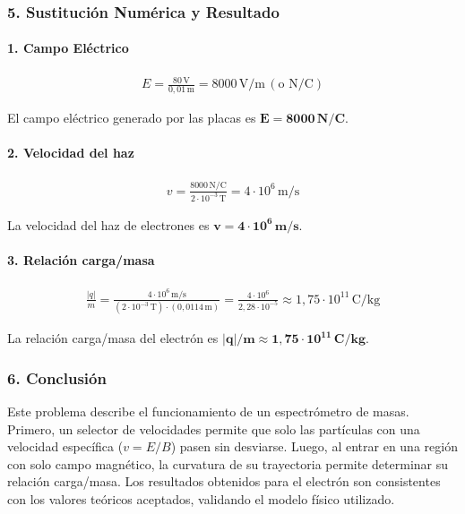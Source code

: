 \subsubsection*{5. Sustitución Numérica y Resultado}
\paragraph{1. Campo Eléctrico}
\begin{gather}
    E = \frac{80 \, \text{V}}{0,01 \, \text{m}} = 8000 \, \text{V/m} \, (\text{o N/C})
\end{gather}
\begin{cajaresultado}
El campo eléctrico generado por las placas es $\boldsymbol{E = 8000 \, N/C}$.
\end{cajaresultado}

\paragraph{2. Velocidad del haz}
\begin{gather}
    v = \frac{8000 \, \text{N/C}}{2 \cdot 10^{-3} \, \text{T}} = 4 \cdot 10^6 \, \text{m/s}
\end{gather}
\begin{cajaresultado}
La velocidad del haz de electrones es $\boldsymbol{v = 4 \cdot 10^6 \, m/s}$.
\end{cajaresultado}

\paragraph{3. Relación carga/masa}
\begin{gather}
    \frac{|q|}{m} = \frac{4 \cdot 10^6 \, \text{m/s}}{(2 \cdot 10^{-3} \, \text{T}) \cdot (0,0114 \, \text{m})} = \frac{4 \cdot 10^6}{2,28 \cdot 10^{-5}} \approx 1,75 \cdot 10^{11} \, \text{C/kg}
\end{gather}
\begin{cajaresultado}
La relación carga/masa del electrón es $\boldsymbol{|q|/m \approx 1,75 \cdot 10^{11} \, C/kg}$.
\end{cajaresultado}

\subsubsection*{6. Conclusión}
\begin{cajaconclusion}
Este problema describe el funcionamiento de un espectrómetro de masas. Primero, un selector de velocidades permite que solo las partículas con una velocidad específica ($v=E/B$) pasen sin desviarse. Luego, al entrar en una región con solo campo magnético, la curvatura de su trayectoria permite determinar su relación carga/masa. Los resultados obtenidos para el electrón son consistentes con los valores teóricos aceptados, validando el modelo físico utilizado.
\end{cajaconclusion}

